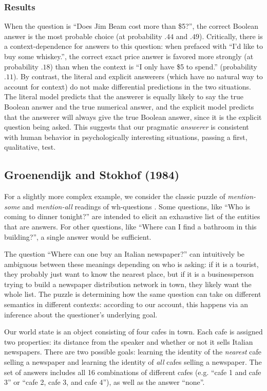 \documentclass[12pt, floatsintext, man]{apa6}
\begin{document}
\subsubsection{Results} When the question is ``Does Jim Beam cost more than \$5?'', the correct Boolean answer is  the most probable choice (at probability $.44$ and $.49$). Critically, there is a context-dependence for answers to this question: when prefaced with ``I'd like to buy some whiskey.'', the correct exact price answer is favored more strongly (at probability $.18$) than when the context is ``I only have \$5 to spend.'' (probability $.11$). By contrast, the literal and explicit answerers (which have no natural way to account for context) do not make differential predictions in the two situations. The literal model predicts that the answerer is equally likely to say the true Boolean answer and the true numerical answer, and the explicit model predicts that the answerer will always give the true Boolean answer, since it is the explicit question being asked. This suggests that our pragmatic \emph{answerer} is consistent with human behavior in psychologically interesting situations, passing a first, qualitative, test. 

\subsection{Groenendijk and Stokhof (1984)}

For a slightly more complex example, we consider the classic puzzle of \emph{mention-some} and \emph{mention-all} readings of wh-questions  \cite{GroenendijkStokhof84_SemanticsOfQuestions,SchulzVanRooij06_ExhaustiveInterpretation}. Some questions, like ``Who is coming to dinner tonight?'' are intended to elicit an exhaustive list of the entities that are answers. For other questions, like ``Where can I find a bathroom in this building?'', a single answer would be sufficient. 

The question ``Where can one buy an Italian newspaper?'' can intuitively be ambiguous between these meanings depending on who is asking: if it is a tourist, they probably just want to know the nearest place, but if it is a businessperson trying to build a newspaper distribution network in town, they likely want the whole list. The puzzle is determining how the same question can take on different semantics in different contexts: according to our account, this happens via an inference about the questioner's underlying goal.

Our world state is an object consisting of four cafes in town. Each cafe is assigned two properties: its distance from the speaker and whether or not it sells Italian newspapers. There are two possible goals: learning the identity of the \emph{nearest} cafe selling a newspaper and learning the identity of \emph{all} cafes selling a newspaper. The set of answers includes all 16 combinations of different cafes (e.g. ``cafe 1 and cafe 3'' or ``cafe 2, cafe 3, and cafe 4''), as well as the answer ``none''. 
\end{document}
